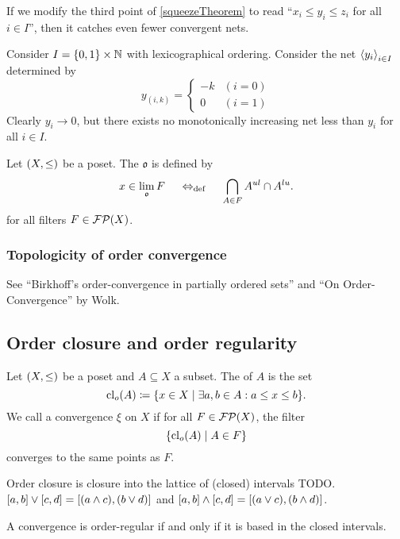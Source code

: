 \begin{example}
If we modify the third point of \ref{squeezeTheorem} to read ``$x_i \leq y_i \leq z_i$ for all $i\in I$'', then it catches even fewer convergent nets.

Consider $I = \{0,1\}\times\mathbb{N}$ with lexicographical ordering. Consider the net $\left\langle y_i \right\rangle_{i\in I}$ determined by
\[ y_{(i,k)} = \begin{cases}
-k & (i=0) \\
0 & (i=1)
\end{cases} \]
Clearly $y_i \to 0$, but there exists no monotonically increasing net less than $y_i$ for all $i\in I$.
\end{example}



\begin{definition}
Let $\sSet{X,\leq}$ be a poset. The  $\mathfrak{o}$ is defined by
\[ x\in \lim_\mathfrak{o}F \;\quad\Leftrightarrow_{\text{def}}\quad\;  \bigcap_{A\in F} A^{ul} \cap A^{lu}.
\]
for all filters $F\in \operatorname{\mathcal{FP}}(X)$.
\end{definition}

\subsubsection{Topologicity of order convergence}
See ``Birkhoff's order-convergence in partially ordered sets'' and ``On Order-Convergence'' by Wolk.

\subsection{Order closure and order regularity}
\begin{definition}
Let $\sSet{X, \leq}$ be a poset and $A\subseteq X$ a subset. The  of $A$ is the set
\[ \closure_o(A) \defeq \setbuilder{x\in X}{\exists a,b\in A: a\leq x\leq b}. \]
We call a convergence $\xi$ on $X$  if for all $F\in \operatorname{\mathcal{FP}}(X)$, the filter
\[ \setbuilder{\closure_o(A)}{A\in F} \]
converges to the same points as $F$.
\end{definition}
Order closure is closure into the lattice of (closed) intervals TODO. $\interval{a,b}\vee \interval{c,d} = \interval{(a\wedge c), (b\vee d)}$ and $\interval{a,b}\wedge \interval{c,d} = \interval{(a\vee c), (b\wedge d)}$.


\begin{lemma}
A convergence is order-regular \textup{if and only if} it is based in the closed intervals.
\end{lemma}

